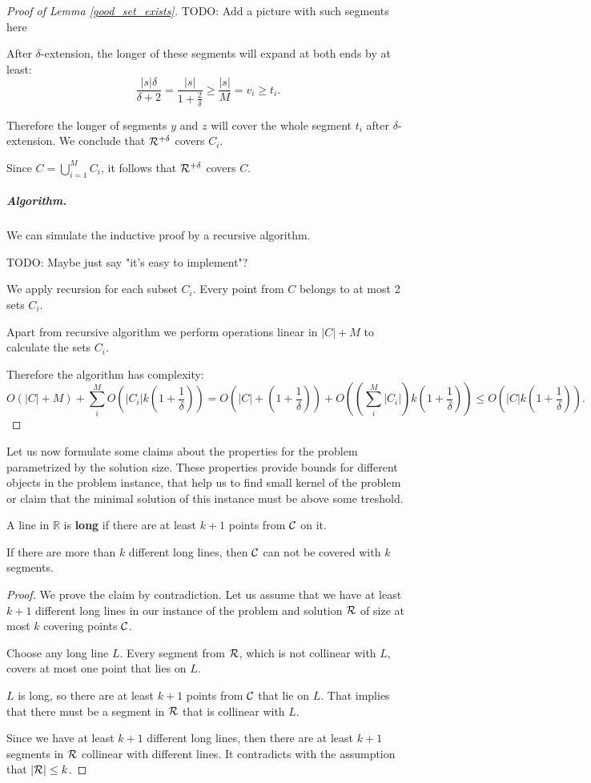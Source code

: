 \begin{proof}[Proof of Lemma \ref{good_set_exists}]
TODO: Add a picture with such segments here

After $\delta$-extension, the longer of these segments will
expand at both ends by at least:
$$\frac{|s|\delta}{\delta+2} = \frac{|s|}{1+\frac{2}{\delta}} \ge \frac{|s|}{M} = v_i \ge t_i.$$

Therefore the longer of segments $y$ and $z$ will cover the whole segment $t_i$
after $\delta$-extension. We conclude that $\mathcal{R}^{+\delta}$ covers $C_i$.

Since $C = \bigcup_{i=1}^M C_i$,
it follows that $\mathcal{R}^{+\delta}$ covers $C$.


\subparagraph{Algorithm.}

We can simulate the inductive proof by a recursive algorithm.

TODO: Maybe just say "it's easy to implement"?

We apply recursion for each subset $C_i$. Every point
from $C$ belongs to at most 2 sets $C_i$.

Apart from recursive algorithm we perform operations linear in
$|C| + M$ to calculate the sets $C_i$.

Therefore the algorithm has complexity:
$$O(|C|+M) + \sum_i^M O(|C_i|k(1+\frac{1}{\delta})) = 
O(|C| + (1+\frac{1}{\delta})) + O((\sum_i^M |C_i|)k(1+\frac{1}{\delta}))
\le O(|C|k(1+\frac{1}{\delta})).$$

\end{proof}

Let us now formulate some claims about the
properties for the problem parametrized by the solution size.
These properties provide bounds for different
objects in the problem instance,
that help us to find small kernel of the problem
or claim that the minimal
solution of this instance must be above some treshold.

\begin{defi}
A line in $\mathbb{R}$ is \textbf{long} if there are at least $k+1$ points from $\mathcal{C}$ on it.
\end{defi}

\begin{claim}
\label{few_long_lines}
If there are more than $k$ different long lines, then 
$\mathcal{C}$ can not be covered with $k$ segments.
\end{claim}

\begin{proof}
We prove the claim by contradiction.
Let us assume that we have at least $k+1$ different
long lines in our instance of the problem
and solution $\mathcal{R}$ of size at most $k$
covering points $\mathcal{C}$.

Choose any long line $L$.
Every segment from $\mathcal{R}$, which is not collinear with $L$,
covers at most one point that lies on $L$.

$L$ is long, so there are at least $k+1$ points from $\mathcal{C}$ that lie on $L$.
That implies that there must be a segment in $\mathcal{R}$ that is
collinear with $L$.

Since we have at least $k+1$ different long lines,
then there are at least $k+1$
segments in $\mathcal{R}$ collinear with different lines.
It contradicts with the assumption that $|\mathcal{R}| \le k$.
\end{proof}

